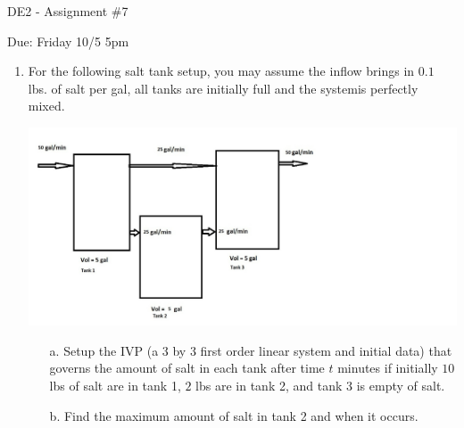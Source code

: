 \documentclass[12pt]{article}
\begin{document}
\centerline{\Large DE2 - Assignment \#7}
\vspace{1cm}
\Large Due: Friday 10/5 5pm 
  
\bigskip \begin{enumerate}
\item For the following salt tank setup, you may assume the inflow brings in $0.1$ lbs. of salt per gal,
all tanks are initially full and the systemis perfectly mixed.
\begin{center}
\includegraphics[scale=0.5]{SaltTank1.jpg}
\end{center}

\begin{enumerate}
\item[a.] Setup the IVP (a 3 by 3 first order linear system and initial data) that governs the amount of salt in
each tank after time $t$ minutes if initially $10$ lbs of salt are in tank 1, $2$ lbs are in tank 2, and tank 3 is 
empty of salt.

\bsni

\item[b.] Find the maximum amount of salt in tank 2 and when it occurs.

\end{enumerate}

\end{enumerate}
\end{document}
